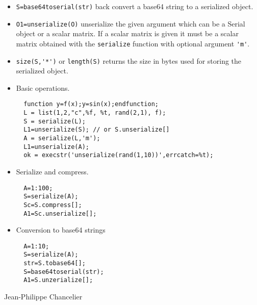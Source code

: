 \begin{itemize}
  \item \verb+S=base64toserial(str)+ back convert a base64 string to a serialized object. 
  \item \verb+O1=unserialize(O)+ unserialize the given argument which can be a Serial object or a scalar matrix. 
    If a scalar matrix is given it must be a scalar matrix obtained with the \verb+serialize+ function with 
    optional argument \verb+'m'+. 
  \item \verb+size(S,'*')+ or \verb+length(S)+ returns the size in bytes used for storing the serialized object.
\end{itemize}

\begin{examples}
\begin{itemize}
\item Basic operations.
\begin{Verbatim}
  function y=f(x);y=sin(x);endfunction;
  L = list(1,2,"c",%f, %t, rand(2,1), f);
  S = serialize(L);
  L1=unserialize(S); // or S.unserialize[]
  A = serialize(L,'m');
  L1=unserialize(A);
  ok = execstr('unserialize(rand(1,10))',errcatch=%t);
\end{Verbatim}
\item Serialize and compress.
\begin{Verbatim}
  A=1:100;
  S=serialize(A);
  Sc=S.compress[];
  A1=Sc.unserialize[];
\end{Verbatim}
\item Conversion to base64 strings 
\begin{Verbatim}
  A=1:10;
  S=serialize(A);
  str=S.tobase64[];
  S=base64toserial(str);
  A1=S.unzerialize[];
\end{Verbatim}
\end{itemize}
\end{examples}

\begin{manseealso}
\end{manseealso}

\begin{authors}
   Jean-Philippe Chancelier
\end{authors}
